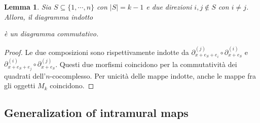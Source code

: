 \documentclass[a4paper]{article}
\newtheorem{lemma}[theorem]{Lemma}
\begin{document}
\begin{lemma}
    Sia \(S \subseteq \{1, \cdots, n\}\)
    con \(|S| = k-1\) e due direzioni \(i,j \notin S\) con \(i\neq j\).
    Allora, il diagramma indotto
    \begin{center}
    \end{center}
    è un diagramma commutativo.
\end{lemma}

\begin{proof}
    Le due composizioni sono rispettivamente indotte da
    \(\partial_{x + e_S + e_i}^{(j)} \circ \partial_{x + e_S}^{(i)}\)
    e \(\partial_{x + e_S + e_j}^{(i)} \circ \partial_{x + e_S}^{(j)}\).
    Questi due morfismi coincidono per la commutatività dei quadrati dell'\(n\)-cocomplesso.
    Per unicità delle mappe indotte, anche le mappe fra gli oggetti \(M_k\) coincidono.
\end{proof}

\subsection{Generalization of intramural maps}
\end{document}
